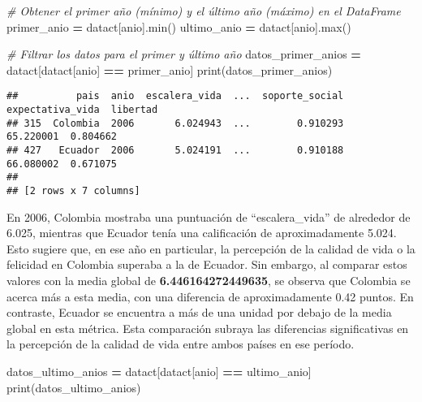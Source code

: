 \documentclass[
]{article}
\newenvironment{Shaded}{\begin{snugshade}}{\end{snugshade}}
\newcommand{\BuiltInTok}[1]{#1}
\newcommand{\CommentTok}[1]{\textcolor[rgb]{0.56,0.35,0.01}{\textit{#1}}}
\newcommand{\NormalTok}[1]{#1}
\newcommand{\OperatorTok}[1]{\textcolor[rgb]{0.81,0.36,0.00}{\textbf{#1}}}
\newcommand{\StringTok}[1]{\textcolor[rgb]{0.31,0.60,0.02}{#1}}
\begin{document}
\begin{Shaded}
\begin{Highlighting}[]
\CommentTok{\# Obtener el primer año (mínimo) y el último año (máximo) en el DataFrame}
\NormalTok{primer\_anio }\OperatorTok{=}\NormalTok{ datact[}\StringTok{\textquotesingle{}anio\textquotesingle{}}\NormalTok{].}\BuiltInTok{min}\NormalTok{()}
\NormalTok{ultimo\_anio }\OperatorTok{=}\NormalTok{ datact[}\StringTok{\textquotesingle{}anio\textquotesingle{}}\NormalTok{].}\BuiltInTok{max}\NormalTok{()}

\CommentTok{\# Filtrar los datos para el primer y último año}
\NormalTok{datos\_primer\_anios }\OperatorTok{=}\NormalTok{ datact[datact[}\StringTok{\textquotesingle{}anio\textquotesingle{}}\NormalTok{] }\OperatorTok{==}\NormalTok{ primer\_anio]}
\BuiltInTok{print}\NormalTok{(datos\_primer\_anios)}
\end{Highlighting}
\end{Shaded}

\begin{verbatim}
##          pais  anio  escalera_vida  ...  soporte_social  expectativa_vida  libertad
## 315  Colombia  2006       6.024943  ...        0.910293         65.220001  0.804662
## 427   Ecuador  2006       5.024191  ...        0.910188         66.080002  0.671075
## 
## [2 rows x 7 columns]
\end{verbatim}

En 2006, Colombia mostraba una puntuación de ``escalera\_vida'' de
alrededor de 6.025, mientras que Ecuador tenía una calificación de
aproximadamente 5.024. Esto sugiere que, en ese año en particular, la
percepción de la calidad de vida o la felicidad en Colombia superaba a
la de Ecuador. Sin embargo, al comparar estos valores con la media
global de \textbf{6.446164272449635}, se observa que Colombia se acerca
más a esta media, con una diferencia de aproximadamente 0.42 puntos. En
contraste, Ecuador se encuentra a más de una unidad por debajo de la
media global en esta métrica. Esta comparación subraya las diferencias
significativas en la percepción de la calidad de vida entre ambos países
en ese período.

\begin{Shaded}
\begin{Highlighting}[]
\NormalTok{datos\_ultimo\_anios }\OperatorTok{=}\NormalTok{ datact[datact[}\StringTok{\textquotesingle{}anio\textquotesingle{}}\NormalTok{] }\OperatorTok{==}\NormalTok{ ultimo\_anio]}
\BuiltInTok{print}\NormalTok{(datos\_ultimo\_anios)}
\end{Highlighting}
\end{Shaded}
\end{document}
